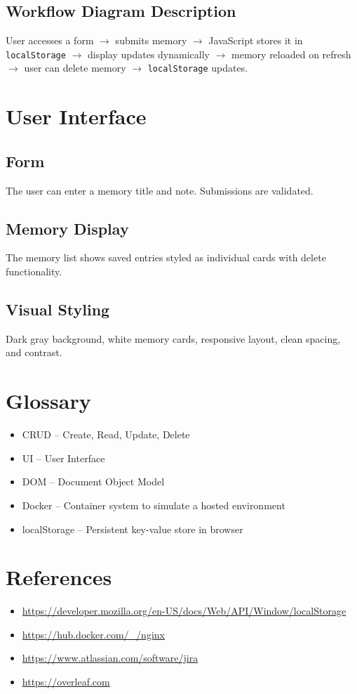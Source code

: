 \documentclass[12pt]{article}
\begin{document}
\subsection*{Workflow Diagram Description}
User accesses a form $\rightarrow$ submits memory $\rightarrow$ JavaScript stores it in \texttt{localStorage} $\rightarrow$ display updates dynamically $\rightarrow$ memory reloaded on refresh $\rightarrow$ user can delete memory $\rightarrow$ \texttt{localStorage} updates.

\section{User Interface}
\subsection*{Form}
The user can enter a memory title and note. Submissions are validated.

\subsection*{Memory Display}
The memory list shows saved entries styled as individual cards with delete functionality.

\subsection*{Visual Styling}
Dark gray background, white memory cards, responsive layout, clean spacing, and contrast.

\section{Glossary}
\begin{itemize}
  \item CRUD -- Create, Read, Update, Delete
  \item UI -- User Interface
  \item DOM -- Document Object Model
  \item Docker -- Container system to simulate a hosted environment
  \item localStorage -- Persistent key-value store in browser
\end{itemize}

\section{References}
\begin{itemize}
  \item \url{https://developer.mozilla.org/en-US/docs/Web/API/Window/localStorage}
  \item \url{https://hub.docker.com/_/nginx}
  \item \url{https://www.atlassian.com/software/jira}
  \item \url{https://overleaf.com}
\end{itemize}
\end{document}
